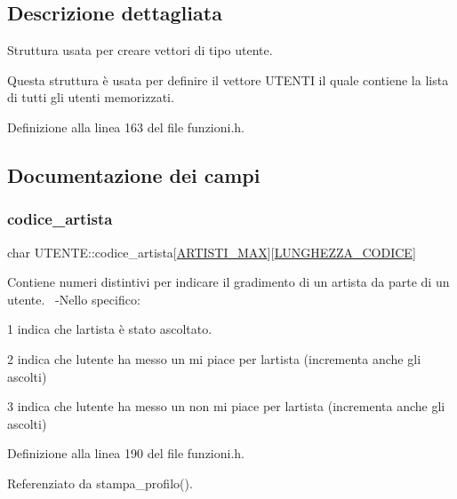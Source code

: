 \subsection{Descrizione dettagliata}
Struttura usata per creare vettori di tipo utente. 

Questa struttura è usata per definire il vettore U\+T\+E\+N\+TI il quale contiene la lista di tutti gli utenti memorizzati. 

Definizione alla linea 163 del file funzioni.\+h.



\subsection{Documentazione dei campi}
\mbox{\label{struct_u_t_e_n_t_e_a0c2bc40343dd678b5033f5c7084dfb43}} 
\subsubsection{\texorpdfstring{codice\+\_\+artista}{codice\_artista}}
{\footnotesize\ttfamily char U\+T\+E\+N\+T\+E\+::codice\+\_\+artista\mbox{[}\hyperlink{funzioni_8h_af17e5297d3cc4c2db33d467698a1b9c2}{A\+R\+T\+I\+S\+T\+I\+\_\+\+M\+AX}\mbox{]}\mbox{[}\hyperlink{funzioni_8h_a15beac41f998f4495a79396160235665}{L\+U\+N\+G\+H\+E\+Z\+Z\+A\+\_\+\+C\+O\+D\+I\+CE}\mbox{]}}

Contiene numeri distintivi per indicare il gradimento di un artista da parte di un utente.~\newline
-\/\+Nello specifico\+:
\begin{DoxyEnumerate}
\item 1 indica che l\textquotesingle{}artista è stato ascoltato.
\item 2 indica che l\textquotesingle{}utente ha messo un mi piace per l\textquotesingle{}artista (incrementa anche gli ascolti)
\item 3 indica che l\textquotesingle{}utente ha messo un non mi piace per l\textquotesingle{}artista (incrementa anche gli ascolti) 
\end{DoxyEnumerate}

Definizione alla linea 190 del file funzioni.\+h.



Referenziato da stampa\+\_\+profilo().


